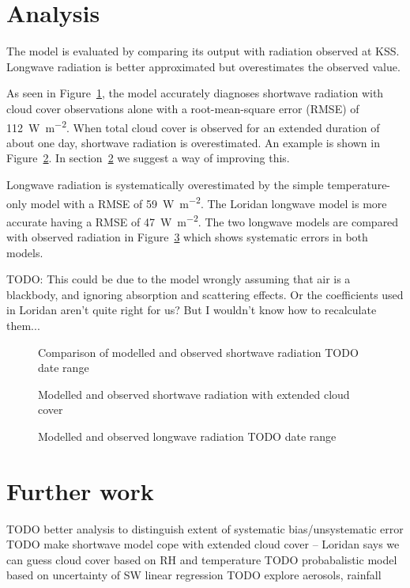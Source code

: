 \documentclass[a4paper,titlepage, twoside]{report}
\begin{document}
\section{Analysis}
\label{sec:model-analysis}
The model is evaluated by comparing its output with radiation observed at KSS.  Longwave radiation is better approximated but overestimates the observed value.  

As seen in Figure~\ref{fig:shortwave-verification}, the model accurately diagnoses shortwave radiation with cloud cover observations alone with a root-mean-square error (RMSE) of \SI{112}{\watt\per\meter\squared}.  When total cloud cover is observed for an extended duration of about one day, shortwave radiation is overestimated.  An example is shown in Figure~\ref{fig:extended-cloud}.  In section~\ref{sec:further-work} we suggest a way of improving this.

Longwave radiation is systematically overestimated by the simple temperature-only model with a RMSE of \SI{59}{\watt\per\meter\squared}.  The Loridan longwave model is more accurate having a RMSE of \SI{47}{\watt\per\meter\squared}.  The two longwave models are compared with observed radiation in Figure~\ref{fig:longwave-verification} which shows systematic errors in both models.

TODO: This could be due to the model wrongly assuming that air is a blackbody, and ignoring absorption and scattering effects.  Or the coefficients used in Loridan aren't quite right for us?  But I wouldn't know how to recalculate them...
\begin {figure}
\centering

\caption{Comparison of modelled and observed shortwave radiation TODO date range}
\label{fig:shortwave-verification}
\end{figure}

\begin{figure}
\centering

\caption{Modelled and observed shortwave radiation with extended cloud cover}
\label{fig:extended-cloud}
\end{figure}

\begin{figure}
\centering

\caption{Modelled and observed longwave radiation TODO date range}
\label{fig:longwave-verification}
\end{figure}

\section{Further work}
\label{sec:further-work}
TODO better analysis to distinguish extent of systematic bias/unsystematic error
TODO make shortwave model cope with extended cloud cover -- Loridan says we can guess cloud cover based on RH and temperature
TODO probabalistic model based on uncertainty of SW linear regression
TODO explore aerosols, rainfall


\printbibliography
\end{document}
